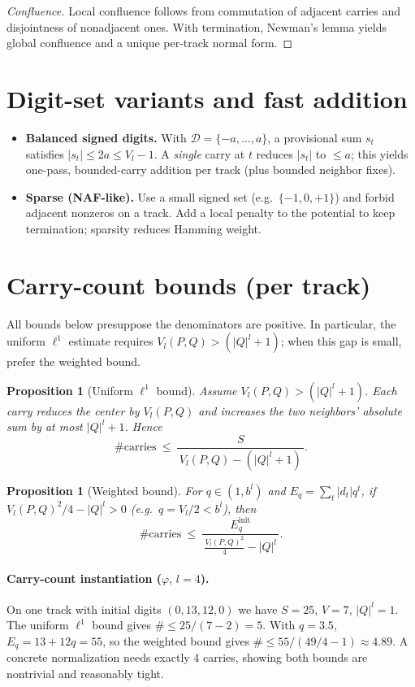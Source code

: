 \documentclass[11pt]{article}
\newtheorem{proposition}[theorem]{Proposition}
\theoremstyle{definition}
\theoremstyle{remark}
\begin{document}
\begin{proof}[Confluence]
Local confluence follows from commutation of adjacent carries and disjointness of nonadjacent ones. With termination, Newman's lemma yields global confluence and a unique per-track normal form.
\end{proof}

\section{Digit-set variants and fast addition}\label{sec:digits-fast}
\begin{itemize}
\item \textbf{Balanced signed digits.} With $\mathcal D=\{-a,\dots,a\}$, a provisional sum $s_t$ satisfies $|s_t|\le 2a\le V_l-1$. A \emph{single} carry at $t$ reduces $|s_t|$ to $\le a$; this yields one-pass, bounded-carry addition per track (plus bounded neighbor fixes).
\item \textbf{Sparse (NAF-like).} Use a small signed set (e.g.\ $\{-1,0,+1\}$) and forbid adjacent nonzeros on a track. Add a local penalty to the potential to keep termination; sparsity reduces Hamming weight.
\end{itemize}

\section{Carry-count bounds (per track)}\label{sec:bounds}
All bounds below presuppose the denominators are positive. In particular, the uniform $\ell^1$ estimate requires $V_l(P,Q)>(|Q|^{l}+1)$; when this gap is small, prefer the weighted bound.

\begin{proposition}[Uniform $\ell^1$ bound]
Assume $V_l(P,Q)>(|Q|^{l}+1)$. Each carry reduces the center by $V_l(P,Q)$ and increases the two neighbors' absolute sum by at most $|Q|^{l}+1$. Hence
\[
\#\mathrm{carries}\ \le\ \frac{S}{\,V_l(P,Q) - (|Q|^{l}+1)\,}.
\]
\end{proposition}

\begin{proposition}[Weighted bound]
For $q\in(1,b^l)$ and $E_q=\sum_t |d_t|q^t$, if $V_l(P,Q)^2/4 - |Q|^{l}>0$ (e.g.\ $q=V_l/2<b^l$), then
\[
\#\mathrm{carries}\ \le\ \frac{E_q^{\mathrm{init}}}{\,\tfrac{V_l(P,Q)^2}{4}-|Q|^{l}\,}.
\]
\end{proposition}

\paragraph{Carry-count instantiation ($\varphi,\,l=4$).}
On one track with initial digits $(0,13,12,0)$ we have $S=25$, $V=7$, $|Q|^l=1$.
The uniform $\ell^1$ bound gives $\#\le 25/(7-2)=5$.
With $q=3.5$, $E_q=13+12q=55$, so the weighted bound gives $\#\le 55/(49/4-1)\approx 4.89$.
A concrete normalization needs exactly 4 carries, showing both bounds are nontrivial and reasonably tight.
\end{document}
